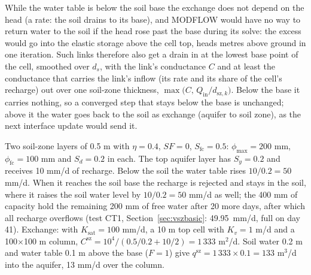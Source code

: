 While the water table is below the soil base the exchange does not depend on the head (a rate: the soil drains to its
base), and MODFLOW would have no way to return water to the soil if the head rose past the base during its solve: the
excess would go into the elastic storage above the cell top, heads metres above ground in one iteration. Such links therefore also get a drain in  at the lowest base point of the cell, smoothed
over $d_s$, with the link's conductance $C$ and at least the conductance that carries the link's inflow (its rate and
its share of the cell's recharge) out over one soil-zone thickness, $\max\big(C,\,Q_{\mathrm{in}}/d_{\mathrm{sz},k}\big)$. Below the
base it carries nothing, so a converged step that stays below the base is unchanged; above it the water goes back to
the soil as exchange (aquifer to soil zone), as the next interface update would send it.

\begin{example}
Two soil-zone layers of 0.5 m with $\eta=0.4$, $\mathit{SF}=0$, $S_{\mathrm{fc}}=0.5$: $\phi_{\max}=200$ mm, $\phi_{\mathrm{fc}}=100$ mm and
$S_d=0.2$ in each. The top aquifer layer has $S_y=0.2$ and receives 10 mm/d of recharge. Below the soil the water table
rises $10/0.2=50$ mm/d. When it reaches the soil base the recharge is rejected and stays in the soil, where it raises
the soil water level by $10/0.2=50$ mm/d as well; the 400 mm of capacity hold the remaining 200 mm of free water after 20
more days, after which all recharge overflows (test CT1, Section~\ref{sec:vszbasic}: 49.95~mm/d, full on day 41). Exchange: with
$K_{\mathrm{sat}}=100$ mm/d, a 10 m top cell with $K_v=1$ m/d and a 100$\times$100 m column,
$C^{\mathrm{sz}}=10^4/(0.5/0.2+10/2)=1\,333$ m$^2$/d. Soil water 0.2 m and water table 0.1 m above the base ($F=1$) give
$q^{\mathrm{sz}}=1\,333\times0.1=133$ m$^3$/d into the aquifer, 13 mm/d over the column.
\end{example}

